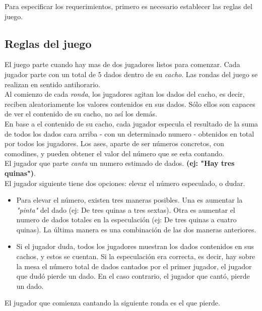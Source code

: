 \documentclass[a4paper,11pt]{article}
\begin{document}
	Para especificar los requerimientos, primero es necesario establecer 
las reglas del juego.

\subsection{Reglas del juego}

	El juego parte cuando hay mas de dos jugadores listos para comenzar.
 Cada jugador parte con un total de 5 dados dentro de su \textit{cacho}. Las 
rondas del juego se realizan en sentido antihorario.\\

	Al comienzo de cada \textit{ronda}, los jugadores agitan los dados del 
cacho, es decir, reciben aleatoriamente los valores contenidos en sus dados.
Sólo ellos son capaces de ver el contenido de su cacho, no así los demás. \\

	En base a el contenido de su cacho, cada jugador especula el resultado 
de la suma de todos los dados cara arriba - con un determinado numero - 
obtenidos en total por todos los jugadores. Los ases, aparte de ser números
concretos, con comodines, y pueden obtener el valor del número que se esta 
contando.\\

	El jugador que parte \textit{canta} un numero estimado de dados. 
\textbf{(ej: "Hay tres quinas")}. \\

	El jugador siguiente tiene dos opciones: elevar el número especulado,
o dudar. \\

\begin{itemize}
\item Para elevar el número, existen tres maneras posibles. Una es aumentar la 
\textit{"pinta"} del dado (ej: De tres quinas a tres sextas). Otra es aumentar el numero de dados totales en la especulación (ej: De tres quinas a cuatro 
quinas). La última manera es una combinación de las dos maneras anteriores.
\item Si el jugador duda, todos los jugadores muestran los dados contenidos
en sus cachos, y estos se cuentan. Si la especulación era correcta, es decir,
hay sobre la mesa el número total de dados cantados por el primer jugador, el 
jugador que dudó pierde un dado. En el caso contrario, el jugador que cantó,
pierde un dado.
\end{itemize}

	El jugador que comienza cantando la siguiente ronda es el que pierde.\\
\end{document}
